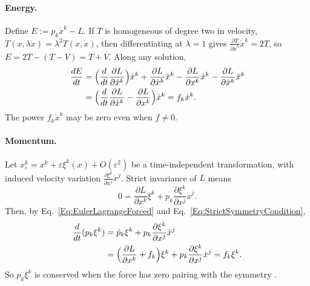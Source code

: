 \paragraph{Energy.} Define $E:=p_k\dot x^k-L$. If $T$ is homogeneous of
degree two in velocity, $T(x,\lambda\dot x)=\lambda^2T(x,\dot x)$, then
differentiating at $\lambda=1$ gives
$\frac{\partial T}{\partial\dot x^k}\dot x^k=2T$, so $E=2T-(T-V)=T+V$.
Along any solution,
\[
\begin{aligned}
 \frac{dE}{dt}
 &=\Bigl(\frac{d}{dt}\frac{\partial L}{\partial\dot x^k}\Bigr)\dot x^k
   +\frac{\partial L}{\partial\dot x^k}\ddot x^k
   -\frac{\partial L}{\partial x^k}\dot x^k
   -\frac{\partial L}{\partial\dot x^k}\ddot x^k\\
 &=\Bigl(\frac{d}{dt}\frac{\partial L}{\partial\dot x^k}
   -\frac{\partial L}{\partial x^k}\Bigr)\dot x^k
  =f_k\dot x^k .
\end{aligned}
\]
The power $f_k\dot x^k$ may be zero even when $f\ne0$.

\paragraph{Momentum.} Let $x_\varepsilon^k=x^k+\varepsilon\xi^k(x)
+O(\varepsilon^2)$ be a time-independent transformation, with induced
velocity variation $\frac{\partial\xi^k}{\partial x^j}\dot x^j$. Strict
invariance of $L$ means
\begin{equation}\label{Eq:StrictSymmetryCondition}
 0=\frac{\partial L}{\partial x^k}\xi^k
   +p_k\frac{\partial\xi^k}{\partial x^j}\dot x^j .
\end{equation}
Then, by Eq.~\ref{Eq:EulerLagrangeForced} and
Eq.~\ref{Eq:StrictSymmetryCondition},
\begin{equation}\label{Eq:ForcedSymmetryBalance}
\begin{aligned}
 \frac{d}{dt}(p_k\xi^k)
 &=\dot p_k\xi^k+p_k\frac{\partial\xi^k}{\partial x^j}\dot x^j\\
 &=\Bigl(\frac{\partial L}{\partial x^k}+f_k\Bigr)\xi^k
   +p_k\frac{\partial\xi^k}{\partial x^j}\dot x^j
 =f_k\xi^k .
\end{aligned}
\end{equation}
So $p_k\xi^k$ is conserved when the force has zero pairing with the symmetry
\cite{deleonforced}.

